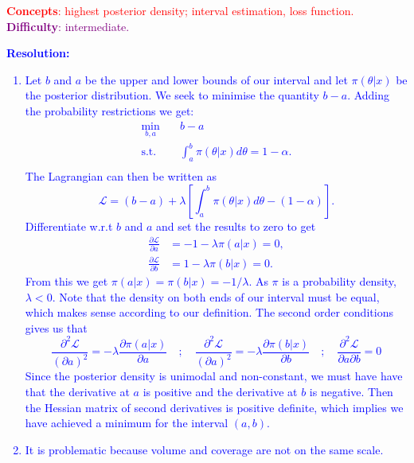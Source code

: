 \textcolor{red}{\textbf{Concepts}: highest posterior density; interval estimation, loss function.}
\textcolor{purple}{\textbf{Difficulty}: intermediate.}\\
\textcolor{blue}{
\textbf{Resolution:}
\begin{enumerate}[label = \alph*)]
    \item Let $b$ and $a$ be the upper and lower bounds of our interval and let $\pi(\theta|x)$ be the posterior distribution. We seek to minimise the quantity $b - a$. Adding the probability restrictions we get:
    \begin{equation*}
        \begin{aligned}
\min_{b,a} \quad & b - a\\
\textrm{s.t.} \quad &   \int_a^b \pi(\theta|x) d\theta = 1-\alpha. \\
\end{aligned}
    \end{equation*}
    The Lagrangian can then be written as
    \begin{equation*}
        \mathcal{L} = (b-a) + \lambda \left[ \int_a^b \pi(\theta|x) d\theta  - (1-\alpha)\right].
    \end{equation*}
    Differentiate w.r.t $b$ and $a$ and set the results to zero to get
    \begin{align*}
        \frac{\partial \mathcal{L}}{\partial a} &= -1 - \lambda \pi(a|x) = 0, \\
        \frac{\partial \mathcal{L}}{\partial b} &= 1 - \lambda \pi(b|x) = 0 .
    \end{align*}
    From this we get $\pi(a|x) = \pi(b|x) = -1/\lambda$. As $\pi$ is a probability density, $\lambda < 0$. Note that the density on both ends of our interval must be equal, which makes sense according to our definition. The second order conditions gives us that 
    \begin{equation*}
        \frac{\partial^2 \mathcal{L}}{(\partial a)^2} = -\lambda \frac{\partial \pi(a|x)}{\partial a} \quad;\quad \frac{\partial^2 \mathcal{L}}{(\partial a)^2} = -\lambda \frac{\partial \pi(b|x)}{\partial b} \quad;\quad \frac{\partial^2 \mathcal{L}}{\partial a\partial b} = 0
    \end{equation*}
    Since the posterior density is unimodal and non-constant, we must have have that the derivative at $a$ is positive and the derivative at $b$ is negative. Then the Hessian matrix of second derivatives is positive definite, which implies we have achieved a minimum for the interval $(a,b)$.
    \item It is problematic because volume and coverage are not on the same scale.

\end{enumerate}}
